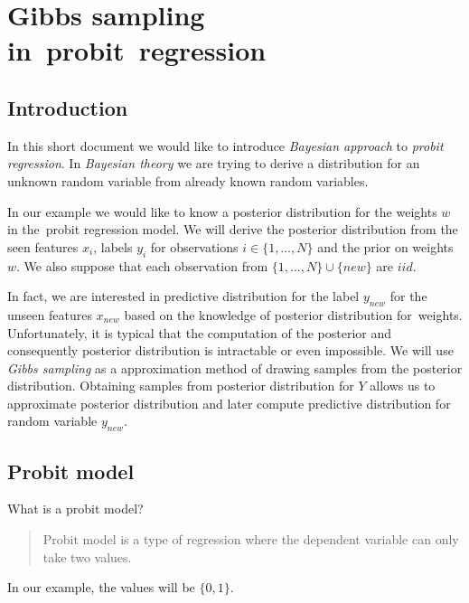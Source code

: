 

\chapter{Gibbs sampling in~probit~regression}
\label{cha:gibbs_sampling_for_probit_regression}


\section{Introduction} 
\label{sec:introduction}
In this short document we would like to introduce {\it Bayesian approach} to {\it probit regression}. In {\it Bayesian theory} we are  trying to derive a distribution for an unknown random variable from already known random variables. 

In our example we would like to know a posterior distribution for the weights $w$ in the~probit regression model. We will derive the posterior distribution from the seen features $x_i$, labels $y_i$ for observations $i\in\{1,\ldots,N\}$ and the prior on weights $w$. We also suppose that each observation from $\{1,\ldots,N\} \cup \{new\}$ are $iid$. 

In fact, we are interested in predictive distribution for the label $y_{new}$ for the unseen features $x_{new}$ based on the knowledge of posterior distribution for~weights. Unfortunately, it is typical that the computation of the posterior and consequently posterior distribution is intractable or even impossible. We will use {\it Gibbs sampling} as a approximation method of drawing samples from the posterior distribution. Obtaining samples from posterior distribution for $Y$ allows us to approximate posterior distribution and later compute predictive distribution for random variable $y_{new}$.



\section{Probit model}
What is a probit model?
\begin{quotation}
    Probit model is a type of regression where the dependent variable can only take two values.
\end{quotation}\cite{wiki_probit}
In our example, the values will be $\{0,1\}$.

